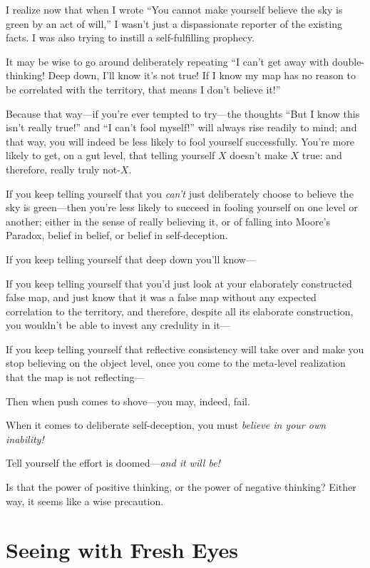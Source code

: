 {
 I realize now that when I wrote ``You cannot make
yourself believe the sky is green by an act of
will,'' I wasn't just a dispassionate
reporter of the existing facts. I was also trying to instill a
self-fulfilling prophecy.}

{
 It may be wise to go around deliberately repeating
``I can't get away with
double-thinking! Deep down, I'll know
it's not true! If I know my map has no reason to be
correlated with the territory, that means I don't
believe it!''}

{
 Because that way---if you're ever tempted to
try---the thoughts ``But I know this
isn't really true!'' and
``I can't fool
myself!'' will always rise readily to mind; and that
way, you will indeed be less likely to fool yourself successfully.
You're more likely to get, on a gut level, that telling
yourself $X$ doesn't make $X$ true: and therefore, really
truly not-$X$.}

{
 If you keep telling yourself that you
\textit{can't} just deliberately choose to believe the
sky is green---then you're less likely to succeed in
fooling yourself on one level or another; either in the sense of really
believing it, or of falling into Moore's Paradox,
belief in belief, or belief in self-deception.}

{
 If you keep telling yourself that deep down you'll
know---}

{
 If you keep telling yourself that you'd just look
at your elaborately constructed false map, and just know that it was a
false map without any expected correlation to the territory, and
therefore, despite all its elaborate construction, you
wouldn't be able to invest any credulity in it---}

{
 If you keep telling yourself that reflective consistency will take
over and make you stop believing on the object level, once you come to
the meta-level realization that the map is not reflecting---}

{
 Then when push comes to shove---you may, indeed, fail.}

{
 When it comes to deliberate self-deception, you must
\textit{believe in your own inability!}}

{
 Tell yourself the effort is doomed---\textit{and it will be!}}

{
 Is that the power of positive thinking, or the power of negative
thinking? Either way, it seems like a wise precaution.}

\myendsectiontext

\chapter{Seeing with Fresh Eyes}

